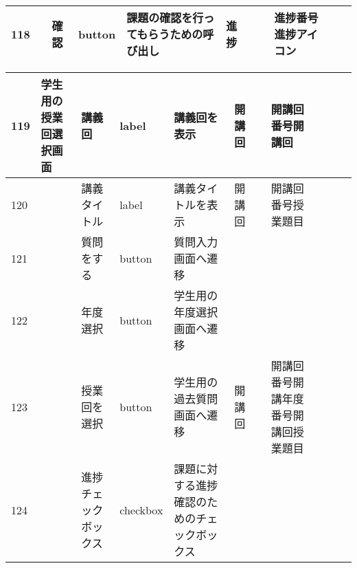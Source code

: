 \begin{landscape}
\begin{table}[]
\begin{tabular}{|l|l|l|l|l|l|l|l|l|l|l|}
118 &               & 確認               & button   & 課題の確認を行ってもらうための呼び出し                                               & 進捗      &                       &                    & 進捗番号進捗アイコン      &                               &                                                                \\ \hline
\end{tabular}
\end{table}




\newpage
\begin{table}[]
\centering
\begin{tabular}{|l|l|l|l|l|l|l|l|l|l|l|}
\hline
119 & 学生用の授業回選択画面   & 講義回              & label    & 講義回を表示                                                            & 開講回     &                       & 開講回番号開講回           &                 &                               &                                                                \\ \hline
120 &               & 講義タイトル           & label    & 講義タイトルを表示                                                         & 開講回     &                       & 開講回番号授業題目          &                 &                               &                                                                \\ \hline
121 &               & 質問をする            & button   & 質問入力画面へ遷移                                                         &         &                       &                    &                 &                               &                                                                \\ \hline
122 &               & 年度選択             & button   & 学生用の年度選択画面へ遷移                                                     &         &                       &                    &                 &                               &                                                                \\ \hline
123 &               & 授業回を選択           & button   & 学生用の過去質問画面へ遷移                                                     & 開講回     &                       & 開講回番号開講年度番号開講回授業題目 &                 &                               &                                                                \\ \hline
124 &               & 進捗チェックボックス       & checkbox & 課題に対する進捗確認のためのチェックボックス                                            &         &                       &                    &                 &                               &                                                                \\ \hline

\end{tabular}
\end{table}
\end{landscape}
